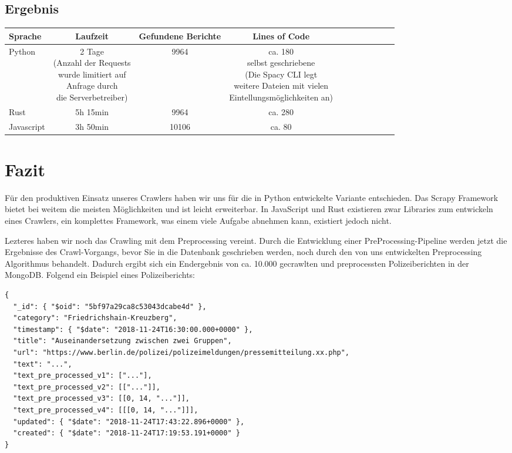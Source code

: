 \subsection{Ergebnis}

\begin{tabular}{| l | c | c | c | c | c | c | c | c | c | c |}
	\hline
	Sprache    & Laufzeit & Gefundene Berichte & Lines of Code\\
	\hline
	Python     & \makecell{2 Tage \\ (Anzahl der Requests \\ wurde limitiert auf  \\ Anfrage durch \\ die Serverbetreiber)} & 9964 &  \makecell{ca. 180 \\ selbst geschriebene  \\ (Die Spacy CLI legt \\ weitere Dateien mit vielen \\ Eintellungsmöglichkeiten an)} \\
	\hline
	Rust       & 5h 15min & 9964 & ca. 280 \\
	\hline
	Javascript & 3h 50min & 10106 & ca. 80 \\
	\hline
\end{tabular}


\section{Fazit}
Für den produktiven Einsatz unseres Crawlers haben wir uns für die in Python entwickelte Variante entschieden.
Das Scrapy Framework bietet bei weitem die meisten Möglichkeiten und ist leicht erweiterbar.
In JavaScript und Rust existieren zwar Libraries zum entwickeln eines Crawlers, ein komplettes Framework, was einem
viele Aufgabe abnehmen kann, existiert jedoch nicht.

Lezteres haben wir noch das Crawling mit dem Preprocessing vereint. Durch die Entwicklung einer PreProcessing-Pipeline
werden jetzt die Ergebnisse des Crawl-Vorgangs, bevor Sie in die Datenbank geschrieben werden, noch durch den von uns
entwickelten Preprocessing Algorithmus behandelt. Dadurch ergibt sich ein Endergebnis von ca. 10.000 gecrawlten und preprocessten
Polizeiberichten in der MongoDB. Folgend ein Beispiel eines Polizeiberichts:

\begin{verbatim}
{
  "_id": { "$oid": "5bf97a29ca8c53043dcabe4d" },
  "category": "Friedrichshain-Kreuzberg",
  "timestamp": { "$date": "2018-11-24T16:30:00.000+0000" },
  "title": "Auseinandersetzung zwischen zwei Gruppen",
  "url": "https://www.berlin.de/polizei/polizeimeldungen/pressemitteilung.xx.php",
  "text": "...",
  "text_pre_processed_v1": ["..."],
  "text_pre_processed_v2": [["..."]],
  "text_pre_processed_v3": [[0, 14, "..."]],
  "text_pre_processed_v4": [[[0, 14, "..."]]],
  "updated": { "$date": "2018-11-24T17:43:22.896+0000" },
  "created": { "$date": "2018-11-24T17:19:53.191+0000" }
}
\end{verbatim}
